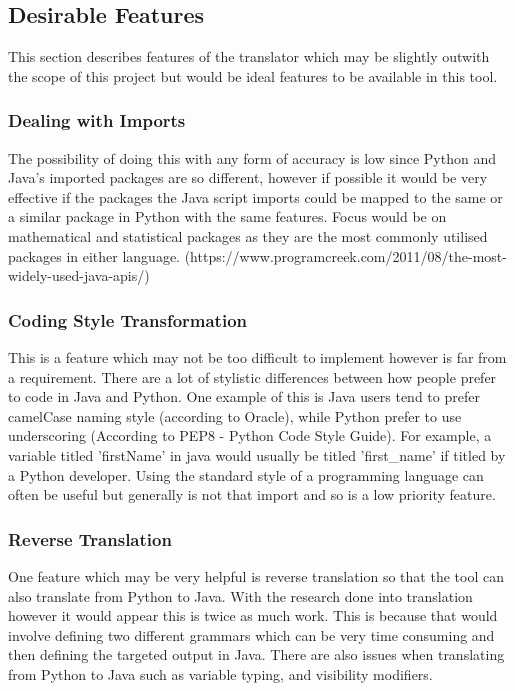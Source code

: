 \documentclass{l4proj}
\begin{document}
\subsection{Desirable Features}
This section describes features of the translator which may be slightly outwith the scope of this project but would be ideal features to be available in this tool.
\subsubsection{Dealing with Imports}
The possibility of doing this with any form of accuracy is low since Python and Java's imported packages are so different, however if possible it would be very effective if the packages the Java script imports could be mapped to the same or a similar package in Python with the same features. Focus would be on mathematical and statistical packages as they are the most commonly utilised packages in either language. (https://www.programcreek.com/2011/08/the-most-widely-used-java-apis/)

\subsubsection{Coding Style Transformation}
This is a feature which may not be too difficult to implement however is far from a requirement. There are a lot of stylistic differences between how people prefer to code in Java and Python. One example of this is Java users tend to prefer camelCase naming style (according to Oracle), while Python prefer to use underscoring (According to PEP8 - Python Code Style Guide). For example, a variable titled 'firstName' in java would usually be titled 'first\_name' if titled by a Python developer. Using the standard style of a programming language can often be useful but generally is not that import and so is a low priority feature.

\subsubsection{Reverse Translation}
One feature which may be very helpful is reverse translation so that the tool can also translate from Python to Java. With the research done into translation however it would appear this is twice as much work. This is because that would involve defining two different grammars which can be very time consuming and then defining the targeted output in Java. There are also issues when translating from Python to Java such as variable typing, and visibility modifiers.
\end{document}
